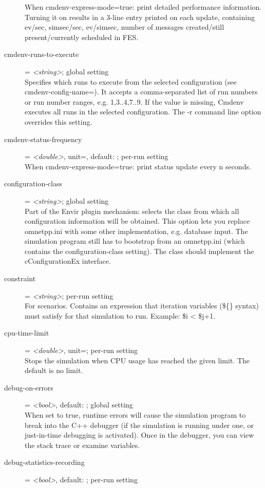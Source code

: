 \begin{description}
    When cmdenv-express-mode=true: print detailed performance information.
    Turning it on results in a 3-line entry printed on each update, containing
    ev/sec, simsec/sec, ev/simsec, number of messages created/still
    present/currently scheduled in FES.
\item[cmdenv-runs-to-execute] = \textit{<string>}; global setting \\
    Specifies which runs to execute from the selected configuration (see
    cmdenv-config-name=). It accepts a comma-separated list of run numbers or
    run number ranges, e.g. 1,3..4,7..9. If the value is missing, Cmdenv
    executes all runs in the selected configuration. The -r command line option
    overrides this setting.
\item[cmdenv-status-frequency] = \textit{<double>}, unit=, default: ; per-run setting \\
    When cmdenv-express-mode=true: print status update every n seconds.
\item[configuration-class] = \textit{<string>}; global setting \\
    Part of the Envir plugin mechanism: selects the class from which all
    configuration information will be obtained. This option lets you replace
    omnetpp.ini with some other implementation, e.g. database input. The
    simulation program still has to bootstrap from an omnetpp.ini (which
    contains the configuration-class setting). The class should implement the
    cConfigurationEx interface.
\item[constraint] = \textit{<string>}; per-run setting \\
    For scenarios. Contains an expression that iteration variables (\$\{\}
    syntax) must satisfy for that simulation to run. Example: \$i < \$j+1.
\item[cpu-time-limit] = \textit{<double>}, unit=; per-run setting \\
    Stops the simulation when CPU usage has reached the given limit. The
    default is no limit.
\item[debug-on-errors] = \textit{<bool>}, default: ; global setting \\
    When set to true, runtime errors will cause the simulation program to break
    into the C++ debugger (if the simulation is running under one, or
    just-in-time debugging is activated). Once in the debugger, you can view
    the stack trace or examine variables.
\item[debug-statistics-recording] = \textit{<bool>}, default: ; per-run setting \\

\end{description}

